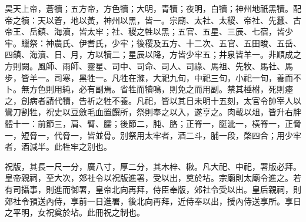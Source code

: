 \begin{pinyinscope}
 昊天上帝，蒼犢；五方帝，方色犢；大明，青犢；夜明，白犢；神州地祇黑犢。配帝之犢：天以蒼，地以黃，神州以黑，皆一。宗廟、太社、太稷、帝社、先蠶、古帝王、岳鎮、海瀆，皆太牢；社、稷之牲以黑；五官、五星、三辰、七宿，皆少牢。蠟祭：神農氏、伊耆氏，少牢；後稷及五方、十二次、五官、五田畯、五岳、四鎮、海瀆、日、月，方以犢二；星辰以降，方皆少牢五；井泉皆羊一。非順成之方則闕。風師、雨師、靈星、司中、司命、司人、司祿、馬祖、先牧、馬社、馬步，皆羊一。司寒，黑牲一。凡牲在滌，大祀九旬，中祀三旬，小祀一旬，養而不卜。無方色則用純，必有副焉。省牲而犢鳴，則免之而用副。禁其棰柎，死則瘞之，創病者請代犢，告祈之牲不養。凡祀，皆以其日未明十五刻，太官令帥宰人以鸞刀割牲，祝史以豆斂毛血置饌所，祭則奉之以入，遂亨之。肉載以俎，皆升右胖體十一：前節三，肩、臂、臑；後節二，肫、胳；正脊一，脡泚一，橫脊一，正脅一，短脅一，代脅一，皆並骨。別祭用太牢者，酒二斗，脯一段，棨四合；用少牢者，酒減半。此牲牢之別也。



 祝版，其長一尺一分，廣八寸，厚二分，其木梓、楸。凡大祀、中祀，署版必拜。皇帝親祠，至大次，郊社令以祝版進署，受以出，奠於坫。宗廟則太廟令進之。若有司攝事，則進而御署，皇帝北向再拜，侍臣奉版，郊社令受以出。皇后親祠，則郊社令預送內侍，享前一日進署，後北向再拜，近侍奉以出，授內侍送享所。享日之平明，女祝奠於坫。此冊祝之制也。



\end{pinyinscope}